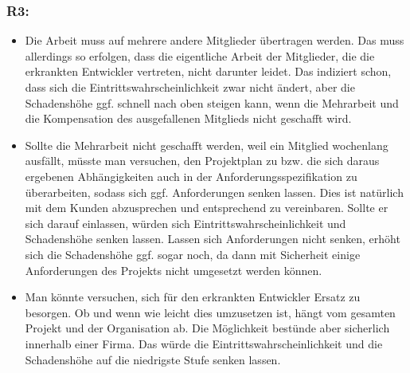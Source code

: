 \documentclass{swp1}
\begin{document}
\subsubsection*{R3:}
\begin{itemize}
\item Die Arbeit muss auf mehrere andere Mitglieder übertragen werden. Das muss allerdings so erfolgen, dass die eigentliche Arbeit der Mitglieder, die die erkrankten Entwickler vertreten, nicht darunter leidet. Das indiziert schon, dass sich die Eintrittswahrscheinlichkeit zwar nicht ändert, aber die Schadenshöhe ggf. schnell nach oben steigen kann, wenn die Mehrarbeit und die Kompensation des ausgefallenen Mitglieds nicht geschafft wird.
\item Sollte die Mehrarbeit nicht geschafft werden, weil ein Mitglied wochenlang ausfällt, müsste man versuchen, den Projektplan zu bzw. die sich daraus ergebenen Abhängigkeiten auch in der Anforderungsspezifikation zu überarbeiten, sodass sich ggf. Anforderungen senken lassen. Dies ist natürlich mit dem Kunden abzusprechen und entsprechend zu vereinbaren. Sollte er sich darauf einlassen, würden sich Eintrittswahrscheinlichkeit und Schadenshöhe senken lassen. Lassen sich Anforderungen nicht senken, erhöht sich die Schadenshöhe ggf. sogar noch, da dann mit Sicherheit einige Anforderungen des Projekts nicht umgesetzt werden können.
\item Man könnte versuchen, sich für den erkrankten Entwickler Ersatz zu besorgen. Ob und wenn wie leicht dies umzusetzen ist, hängt vom gesamten Projekt und der Organisation ab. Die Möglichkeit bestünde aber sicherlich innerhalb einer Firma. Das würde die Eintrittswahrscheinlichkeit und die Schadenshöhe auf die niedrigste Stufe senken lassen.
\end{itemize}
\end{document}
